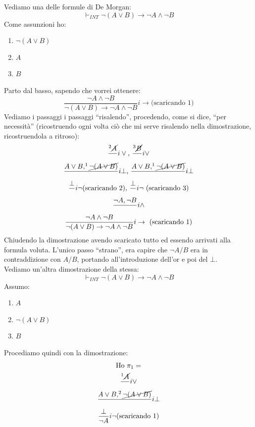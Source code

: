 \documentclass[a4paper,12pt, oneside]{book}
\begin{document}
\begin{esempio}
  Vediamo una delle formule di De Morgan:
  \[\vdash_{INT}\neg(A\lor B)\to \neg A\land \neg B\]
  Come assunzioni ho:
  \begin{enumerate}
    \item $\neg (A\lor B)$
    \item $A$
    \item $B$
  \end{enumerate}
  Parto dal basso, sapendo che vorrei ottenere:
  \[\frac{\neg A\land \neg B}{\neg(A\lor B)\to \neg A\land \neg B}i\to\mbox{
      (scaricando 1)}\]
  Vediamo i passaggi i passaggi ``risalendo'', procedendo, come si dice, ``per
  necessità'' (ricostruendo ogni volta ciò che mi serve risalendo nella
  dimostrazione, ricostruendola a ritroso): 
  \begin{gather*}
    \frac{^2\cancel{A}}{}i\lor \mbox{, } \frac{^3\cancel{B}}{}i\lor\\
    \frac{A\lor B, ^1\cancel{\neg (A\lor B)}}{}i\bot \mbox{, } \frac{A\lor
      B,^1\cancel{\neg (A\lor B)}}{}i\bot\\  
    \frac{\bot}{}i\neg \mbox{(scaricando 2), }\frac{\bot}{}i\neg\mbox{
      (scaricando 3)}\\ 
    \frac{\neg A, \neg B}{}i\land\\
    \frac{\neg A\land \neg B}{\neg(A\lor B)\to \neg A\land \neg B}i\to\mbox{
      (scaricando 1)}
  \end{gather*}
  Chiudendo la dimostrazione avendo scaricato tutto ed essendo arrivati alla
  formula voluta. L'unico passo ``strano'', era capire che $\neg A/B$ era in
  contraddizione con $A/B$, portando all'introduzione dell'or e poi del
  $\bot$.\\
  Vediamo un'altra dimostrazione della stessa:
  \[\vdash_{INT}\neg(A\lor B)\to \neg A\land \neg B\]
  Assumo:
  \begin{enumerate}
    \item $A$
    \item $\neg(A\lor B)$
    \item $B$
  \end{enumerate}
  Procediamo quindi con la dimostrazione:
  \begin{gather*}
    \mbox{Ho }\pi_1 =\\
    \frac{ ^1\cancel{A}}{}i\lor\\
    \frac{A\lor B, ^2\cancel{\neg(A\lor B)}}{}i\bot\\
    \frac{\bot}{\neg A}i\neg\mbox{(scaricando 1)}\\

\end{gather*}
\end{esempio}
\end{document}
